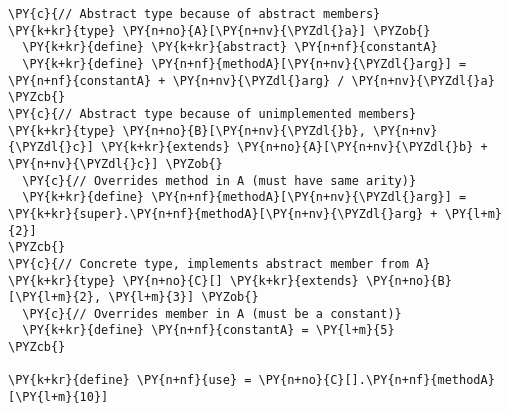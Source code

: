 \begin{Verbatim}[commandchars=\\\{\}]
\PY{c}{// Abstract type because of abstract members}
\PY{k+kr}{type} \PY{n+no}{A}[\PY{n+nv}{\PYZdl{}a}] \PYZob{}
  \PY{k+kr}{define} \PY{k+kr}{abstract} \PY{n+nf}{constantA}
  \PY{k+kr}{define} \PY{n+nf}{methodA}[\PY{n+nv}{\PYZdl{}arg}] = \PY{n+nf}{constantA} + \PY{n+nv}{\PYZdl{}arg} / \PY{n+nv}{\PYZdl{}a}
\PYZcb{}
\PY{c}{// Abstract type because of unimplemented members}
\PY{k+kr}{type} \PY{n+no}{B}[\PY{n+nv}{\PYZdl{}b}, \PY{n+nv}{\PYZdl{}c}] \PY{k+kr}{extends} \PY{n+no}{A}[\PY{n+nv}{\PYZdl{}b} + \PY{n+nv}{\PYZdl{}c}] \PYZob{}
  \PY{c}{// Overrides method in A (must have same arity)}
  \PY{k+kr}{define} \PY{n+nf}{methodA}[\PY{n+nv}{\PYZdl{}arg}] = \PY{k+kr}{super}.\PY{n+nf}{methodA}[\PY{n+nv}{\PYZdl{}arg} + \PY{l+m}{2}]
\PYZcb{}
\PY{c}{// Concrete type, implements abstract member from A}
\PY{k+kr}{type} \PY{n+no}{C}[] \PY{k+kr}{extends} \PY{n+no}{B}[\PY{l+m}{2}, \PY{l+m}{3}] \PYZob{}
  \PY{c}{// Overrides member in A (must be a constant)}
  \PY{k+kr}{define} \PY{n+nf}{constantA} = \PY{l+m}{5}
\PYZcb{}

\PY{k+kr}{define} \PY{n+nf}{use} = \PY{n+no}{C}[].\PY{n+nf}{methodA}[\PY{l+m}{10}]
\end{Verbatim}
